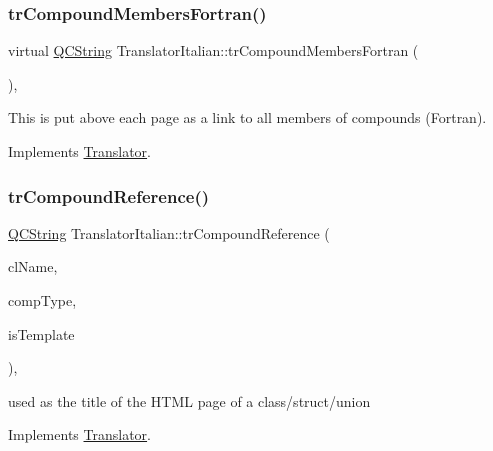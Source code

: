 \subsubsection{\texorpdfstring{trCompoundMembersFortran()}{trCompoundMembersFortran()}}
{\footnotesize\ttfamily virtual \mbox{\hyperlink{class_q_c_string}{Q\+C\+String}} Translator\+Italian\+::tr\+Compound\+Members\+Fortran (\begin{DoxyParamCaption}{ }\end{DoxyParamCaption})\hspace{0.3cm}{\ttfamily [inline]}, {\ttfamily [virtual]}}

This is put above each page as a link to all members of compounds (Fortran). 

Implements \mbox{\hyperlink{class_translator}{Translator}}.

\mbox{\label{class_translator_italian_abfa7be36cc267c88e65de4a1f09917ee}} 
\subsubsection{\texorpdfstring{trCompoundReference()}{trCompoundReference()}}
{\footnotesize\ttfamily \mbox{\hyperlink{class_q_c_string}{Q\+C\+String}} Translator\+Italian\+::tr\+Compound\+Reference (\begin{DoxyParamCaption}\item[{const char $\ast$}]{cl\+Name,  }\item[{\mbox{\hyperlink{class_class_def_ae70cf86d35fe954a94c566fbcfc87939}{Class\+Def\+::\+Compound\+Type}}}]{comp\+Type,  }\item[{bool}]{is\+Template }\end{DoxyParamCaption})\hspace{0.3cm}{\ttfamily [inline]}, {\ttfamily [virtual]}}

used as the title of the H\+T\+ML page of a class/struct/union 

Implements \mbox{\hyperlink{class_translator}{Translator}}.

\mbox{\label{class_translator_italian_a19e0fc5292ace562b8cd564cde606d61}} 
